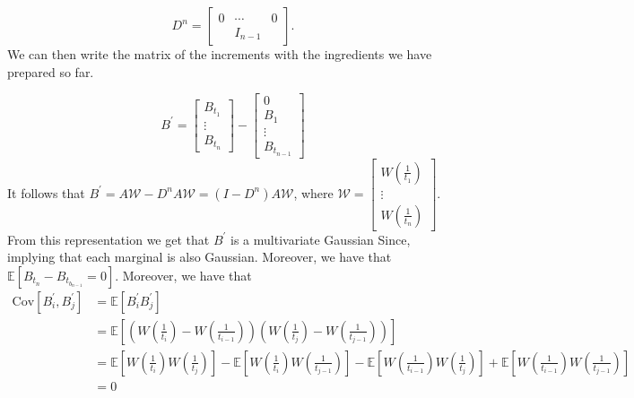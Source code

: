 \documentclass[a4paper,12pt]{article} %
\newcommand{\Cov}{\mathrm{Cov}}
\begin{document}
\begin{equation}
    D^n =
    \begin{bmatrix}
        0 & \cdots  & 0 \\
          & I_{n-1} &
    \end{bmatrix}.
\end{equation}
We can then write the matrix of the increments with the ingredients we have prepared so far.

\begin{equation}B^{\prime} =
    \begin{bmatrix}
        B_{t_1} \\
        \vdots  \\
        B_{t_n}
    \end{bmatrix}
    -
    \begin{bmatrix}
        0      \\
        B_1    \\
        \vdots \\
        B_{t_{n-1}}
    \end{bmatrix}
\end{equation}
It follows that \(B^{\prime} = A \mathcal{W}- D^{n}A \mathcal{W}  =(I-D^n)A \mathcal{W} \), where \(\mathcal{W} = \begin{bmatrix}
    W\left( \frac{1}{t_1} \right) \\
    \vdots                        \\
    W\left( \frac{1}{t_n} \right)
\end{bmatrix}\).
From this representation we get that \(B^{\prime} \) is a multivariate Gaussian Since, implying that each marginal is also Gaussian.
Moreover, we have that \(\mathbb{E} \left[ B_{t_n}- B_{t_{b_{n-1}}} = 0  \right]\). Moreover, we have that
\begin{align*}
    \Cov\left[B^{\prime}_i, B^{\prime} _j \right]
     & = \mathbb{E} \left[ B_{i}^{\prime}B^{\prime} _j   \right]                                                                                                                                                                                                                                                                                                                       \\
     & = \mathbb{E} \left[ \left( W\left( \frac{1}{t_i} \right) - W\left( \frac{1}{t_{i-1}} \right) \right) \left( W\left( \frac{1}{t_j} \right) - W\left( \frac{1}{t_{j-1}} \right) \right) \right]                                                                                                                                                                                   \\
     & = \mathbb{E} \left[ W\left( \frac{1}{t_i} \right) W\left( \frac{1}{t_j} \right) \right] - \mathbb{E} \left[ W\left( \frac{1}{t_i} \right) W\left( \frac{1}{t_{j-1}} \right) \right] - \mathbb{E} \left[ W\left( \frac{1}{t_{i-1}} \right) W\left( \frac{1}{t_j} \right) \right] + \mathbb{E} \left[ W\left( \frac{1}{t_{i-1}} \right) W\left( \frac{1}{t_{j-1}} \right) \right] \\
     & = 0
\end{align*}
\end{document}
